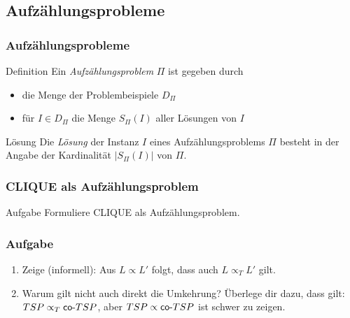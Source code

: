  \subsection{Aufzählungsprobleme}
\begin{frame}
 \frametitle{Aufzählungsprobleme}
 \begin{block}{Definition}
  Ein \emph{Aufzählungsproblem} $\Pi$ ist gegeben durch
  \begin{itemize}
   \item die Menge der Problembeispiele $D_\Pi$
   \item für $I \in D_\Pi$ die Menge $S_\Pi(I)$ aller Lösungen von $I$
  \end{itemize}
  \end{block}
  \begin{block}{Lösung}  
  Die \emph{Lösung} der Instanz $I$ eines Aufzählungsproblems $\Pi$ besteht in der Angabe der Kardinalität $|S_\Pi(I)|$ von $\Pi$.
 \end{block}
\end{frame}

 \begin{frame}
 \frametitle{CLIQUE als Aufzählungsproblem}
  \begin{block}{Aufgabe}
  Formuliere CLIQUE als Aufzählungsproblem.
\end{block}
\end{frame}

\begin{frame}
	\frametitle{Aufgabe}
	
	\begin{enumerate}
		\item Zeige (informell): Aus $L \propto L'$ folgt, dass auch $L \propto_T L'$ gilt.
		\item Warum gilt nicht auch direkt die Umkehrung? Überlege dir dazu, dass gilt: $TSP \propto_T \mathsf{co\text{-}} TSP$, aber $TSP \propto \mathsf{co\text{-}} TSP$ ist schwer zu zeigen.
	\end{enumerate}
\end{frame}

